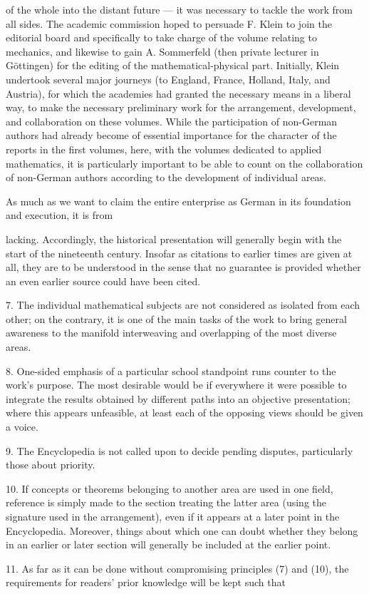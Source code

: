 \thispagestyle{fancy}

\vspace{0.5cm}

of the whole into the distant future — it was necessary to tackle the work from all sides. The academic commission hoped to persuade F. Klein to join the editorial board and specifically to take charge of the volume relating to mechanics, and likewise to gain A. Sommerfeld (then private lecturer in Göttingen) for the editing of the mathematical-physical part. Initially, Klein undertook several major journeys (to England, France, Holland, Italy, and Austria), for which the academies had granted the necessary means in a liberal way, to make the necessary preliminary work for the arrangement, development, and collaboration on these volumes. While the participation of non-German authors had already become of essential importance for the character of the reports in the first volumes, here, with the volumes dedicated to applied mathematics, it is particularly important to be able to count on the collaboration of non-German authors according to the development of individual areas.

As much as we want to claim the entire enterprise as German in its foundation and execution, it is from

\vfill
\leftline{\rule{2in}{0.4pt}}
\vspace{0.2cm}
{\footnotesize lacking. Accordingly, the historical presentation will generally begin with the start of the nineteenth century. Insofar as citations to earlier times are given at all, they are to be understood in the sense that no guarantee is provided whether an even earlier source could have been cited.

7. The individual mathematical subjects are not considered as isolated from each other; on the contrary, it is one of the main tasks of the work to bring general awareness to the manifold interweaving and overlapping of the most diverse areas.

8. One-sided emphasis of a particular school standpoint runs counter to the work's purpose. The most desirable would be if everywhere it were possible to integrate the results obtained by different paths into an objective presentation; where this appears unfeasible, at least each of the opposing views should be given a voice.

9. The Encyclopedia is not called upon to decide pending disputes, particularly those about priority.

10. If concepts or theorems belonging to another area are used in one field, reference is simply made to the section treating the latter area (using the signature used in the arrangement), even if it appears at a later point in the Encyclopedia. Moreover, things about which one can doubt whether they belong in an earlier or later section will generally be included at the earlier point.

11. As far as it can be done without compromising principles (7) and (10), the requirements for readers' prior knowledge will be kept such that

}
